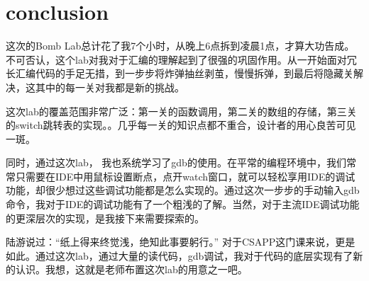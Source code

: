 \section{conclusion}

	这次的Bomb Lab总计花了我7个小时，从晚上6点拆到凌晨1点，才算大功告成。不可否认，这个lab对我对于汇编的理解起到了很强的巩固作用。从一开始面对冗长汇编代码的手足无措，到一步步将炸弹抽丝剥茧，慢慢拆弹，到最后将隐藏关解决，这其中的每一关对我都是新的挑战。
	
	这次lab的覆盖范围非常广泛：第一关的函数调用，第二关的数组的存储，第三关的switch跳转表的实现。。几乎每一关的知识点都不重合，设计者的用心良苦可见一斑。
	
	同时，通过这次lab， 我也系统学习了gdb的使用。在平常的编程环境中，我们常常只需要在IDE中用鼠标设置断点，点开watch窗口，就可以轻松享用IDE的调试功能，却很少想过这些调试功能都是怎么实现的。通过这次一步步的手动输入gdb命令，我对于IDE的调试功能有了一个粗浅的了解。当然，对于主流IDE调试功能的更深层次的实现，是我接下来需要探索的。
	
	陆游说过：“纸上得来终觉浅，绝知此事要躬行。” 对于CSAPP这门课来说，更是如此。通过这次lab，通过大量的读代码，gdb调试，我对于代码的底层实现有了新的认识。我想，这就是老师布置这次lab的用意之一吧。
